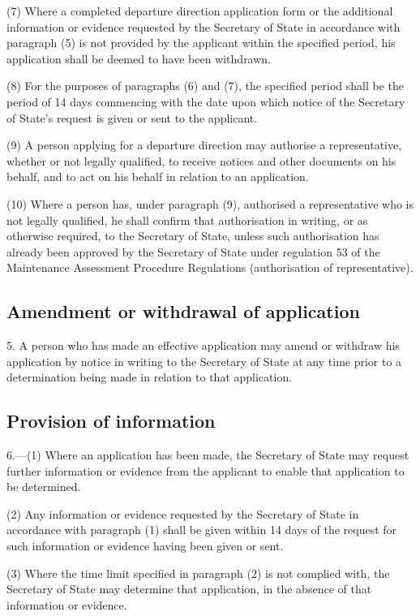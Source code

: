 \documentclass[a4paper]{article}
\begin{document}
(7) Where a completed departure direction application form or the additional information or evidence requested by the Secretary of State in accordance with paragraph (5) is not provided by the applicant within the specified period, his application shall be deemed to have been withdrawn.

(8) For the purposes of paragraphs (6) and (7), the specified period shall be the period of 14 days commencing with the date upon which notice of the Secretary of State’s request is given or sent to the applicant.

(9) A person applying for a departure direction may authorise a representative, whether or not legally qualified, to receive notices and other documents on his behalf, and to act on his behalf in relation to an application.

(10) Where a person has, under paragraph (9), authorised a representative who is not legally qualified, he shall confirm that authorisation in writing, or as otherwise required, to the Secretary of State, unless such authorisation has already been approved by the Secretary of State under regulation 53 of the Maintenance Assessment Procedure Regulations (authorisation of representative).

\subsection[5. Amendment or withdrawal of application]{Amendment or withdrawal of application}

5.  A person who has made an effective application may amend or withdraw his application by notice in writing to the Secretary of State at any time prior to a determination being made in relation to that application.

\subsection[6. Provision of information]{Provision of information}

6.—(1) Where an application has been made, the Secretary of State may request further information or evidence from the applicant to enable that application to be determined.

(2) Any information or evidence requested by the Secretary of State in accordance with paragraph (1) shall be given within 14 days of the request for such information or evidence having been given or sent.

(3) Where the time limit specified in paragraph (2) is not complied with, the Secretary of State may determine that application, in the absence of that information or evidence.
\end{document}
